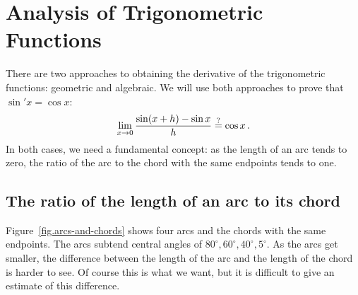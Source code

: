 
\chapter{Analysis of Trigonometric Functions}

There are two approaches to obtaining the derivative of the trigonometric functions: geometric and algebraic. We will use both approaches to prove that $\sin' x=\cos x$:
\[
\lim_{x \rightarrow 0} \displaystyle\frac{\sin (x+h)-\sin x}{h}\stackrel{?}{=}\cos x\,.
\]
In both cases, we need a fundamental concept: as the length of an arc tends to zero, the ratio of the arc to the chord with the same endpoints tends to one.

\section{The ratio of the length of an arc to its chord}

Figure~\ref{fig.arcs-and-chords} shows four arcs and the chords with the same endpoints. The arcs subtend central angles of $80^\circ, 60^\circ, 40^\circ, 5^\circ$. As the arcs get smaller, the difference between the length of the arc and the length of the chord is harder to see. Of course this is what we want, but it is difficult to give an estimate of this difference.


